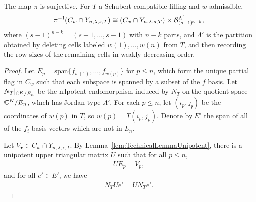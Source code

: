 \documentclass[12pt]{amsart}
\newcommand{\vspan}{\mathrm{span}}
\newcommand{\la}{\lambda}
\begin{document}
\begin{lemma}\label{lem:FiberBundle}
The map $\pi$ is surjective. For $T$ a Schubert compatible filling and $w$ admissible,
\begin{align}\label{eq:FiberBundleIso}
\pi^{-1}(C_{w}\cap Y_{n,\la,s,T}) \cong (C_{w}\cap Y_{n,\la,s,T})\times \cB_{(s-1)^{n-k}}^{\Lambda'},
\end{align}
where $(s-1)^{n-k} = (s-1,\dots, s-1)$ with $n-k$ parts, and $\Lambda'$ is the partition obtained by deleting cells labeled $w(1),\dots, w(n)$ from $T$, and then recording the row sizes of the remaining cells in weakly decreasing order.
\end{lemma}
\begin{proof}
Let  $E_p = \vspan\{f_{w(1)},\dots, f_{w(p)}\}$ for $p\leq n$, which form the unique partial flag in $C_w$ such that each subspace is spanned by a subset of the $f$ basis. Let $N_T|_{\mathbb{C}^K/E_n}$ be the nilpotent endomorphism induced by $N_T$ on the quotient space $\mathbb{C}^K/E_n$, which has Jordan type $\Lambda'$.
 For each $p\leq n$, let $(i_p,j_p)$ be the coordinates of $w(p)$ in $T$, so $w(p) = T(i_p,j_p)$. Denote by $E'$ the span of all of the $f_{i}$ basis vectors which are not in $E_n$.
 
 Let $V_\bullet\in C_w\cap Y_{n,\la,s,T}$. By Lemma~\ref{lem:TechnicalLemmaUnipotent}, there is a unipotent upper triangular matrix $U$ such that for all $p\leq n$,
\begin{align}
U E_p = V_p,
\end{align}
and for all $e'\in E'$, we have 
\begin{align}\label{eq:Commutativity}
N_TU e' = UN_T e'.
\end{align}


\end{proof}
\end{document}
